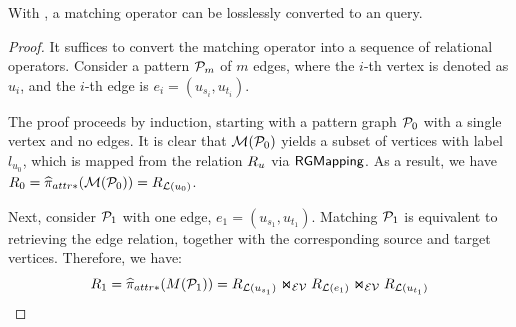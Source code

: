 \begin{lemma}
    \label{lem:spjm-to-spj}
    With \rgmapping, a matching operator can be losslessly converted to an \spj query.
\end{lemma}
\begin{proof}
    It suffices to convert the matching operator into a sequence of relational operators. Consider a pattern $\mathcal{P}_m$ of $m$ edges, where the $i$-th vertex is denoted as $u_i$, and the $i$-th edge is $e_i = (u_{s_i}, u_{t_i})$. %

The proof proceeds by induction, starting with a pattern graph $\mathcal{P}_0$ with a single vertex and no edges. It is clear that $\mathcal{M}(\mathcal{P}_0)$ yields a subset of vertices with label $l_{u_0}$, which is mapped from the relation ${R_{u}}$ via ${\mathsf{RGMapping}}$. As a result, we have $R_0 = \widehat{\pi}_{attr*}(\mathcal{M}(\mathcal{P}_0)) = {R_{\mathcal{L}(u_0)}}$.

Next, consider $\mathcal{P}_1$ with one edge, $e_1 = (u_{s_1}, u_{t_1})$. Matching $\mathcal{P}_1$ is equivalent to retrieving the edge relation, together with the corresponding source and target vertices. Therefore, we have:
\[ R_1 = \widehat{\pi}_{attr*}(M(\mathcal{P}_1)) = {R_{\mathcal{L}(u_{s_1})}} \Join_\mathcal{EV} {R_{\mathcal{L}(e_1)}} \Join_\mathcal{EV} {R_{\mathcal{L}(u_{t_1})}} \]


\end{proof}
